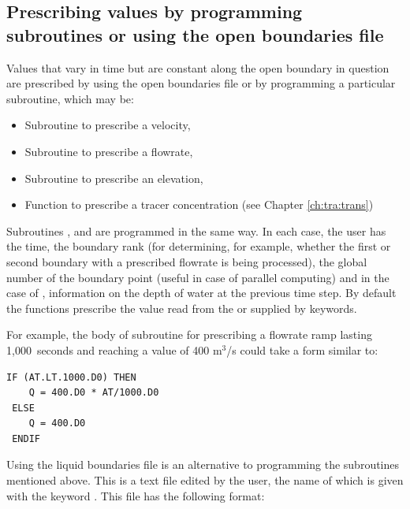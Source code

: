\subsection{Prescribing values by programming subroutines or using the open boundaries file}
\label{subs:val:funct:bf}
Values that vary in time but are constant along the open boundary in question
are prescribed by using the open boundaries file or by programming a particular
subroutine, which may be:

\begin{itemize}
\item Subroutine  to prescribe a velocity,

\item Subroutine  to prescribe a flowrate,

\item Subroutine  to prescribe an elevation,

\item Function  to prescribe a tracer concentration
(see Chapter \ref{ch:tra:trans})
\end{itemize}

Subroutines ,  and  are
programmed in the same way.
In each case, the user has the time, the boundary rank (for determining,
for example, whether the first or second boundary with a prescribed flowrate
is being processed),
the global number of the boundary point (useful in case of parallel computing)
and in the case of , information on the depth of water
at the previous time step.
By default the functions prescribe the value read from
the  or supplied by keywords.

For example, the body of subroutine  for prescribing a flowrate
ramp lasting 1,000~seconds and reaching a value of 400 m$^3$/s could take
a form similar to:
\begin{lstlisting}[language=TelFortran]
 IF (AT.LT.1000.D0) THEN
    Q = 400.D0 * AT/1000.D0
 ELSE
    Q = 400.D0
 ENDIF
\end{lstlisting}
Using the liquid boundaries file is an alternative to programming the subroutines
mentioned above.
This is a text file edited by the user, the name of which is given with the
keyword .
This file has the following format:

